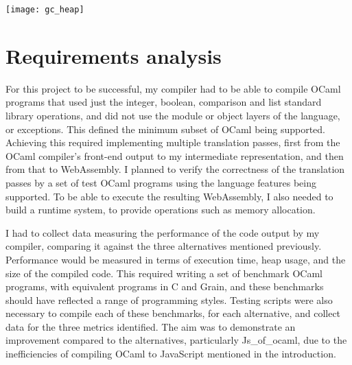 

\hspace{-0.18cm}
\texttt{[image: gc\_heap]}





\section{Requirements analysis}
For this project to be successful, my compiler had to be able to compile OCaml programs that used just the integer, boolean, comparison and list standard library operations, and did not use the module or object layers of the language, or exceptions. This defined the minimum subset of OCaml being supported. Achieving this required implementing multiple translation passes, first from the OCaml compiler's front-end output to my intermediate representation, and then from that to WebAssembly. I planned to verify the correctness of the translation passes by a set of test OCaml programs using the language features being supported. To be able to execute the resulting WebAssembly, I also needed to build a runtime system, to provide operations such as memory allocation. 

I had to collect data measuring the performance of the code output by my compiler, comparing it against the three alternatives mentioned previously. Performance would be measured in terms of execution time, heap usage, and the size of the compiled code. This required writing a set of benchmark OCaml programs, with equivalent programs in C and Grain, and these benchmarks should have reflected a range of programming styles. Testing scripts were also necessary to compile each of these benchmarks, for each alternative, and collect data for the three metrics identified. The aim was to demonstrate an improvement compared to the alternatives, particularly Js\_of\_ocaml, due to the inefficiencies of compiling OCaml to JavaScript mentioned in the introduction.


